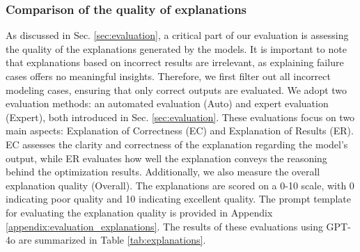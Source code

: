 \subsubsection{Comparison of the quality of explanations}
As discussed in Sec. \ref{sec:evaluation}, a critical part of our evaluation is assessing the quality of the explanations generated by the models. It is important to note that explanations based on incorrect results are irrelevant, as explaining failure cases offers no meaningful insights. Therefore, we first filter out all incorrect modeling cases, ensuring that only correct outputs are evaluated. We adopt two evaluation methods: an automated evaluation (Auto) and expert evaluation (Expert), both introduced in Sec. \ref{sec:evaluation}. These evaluations focus on two main aspects: Explanation of Correctness (EC) and Explanation of Results (ER). EC assesses the clarity and correctness of the explanation regarding the model's output, while ER evaluates how well the explanation conveys the reasoning behind the optimization results. Additionally, we also measure the overall explanation quality (Overall). The explanations are scored on a 0-10 scale, with 0 indicating poor quality and 10 indicating excellent quality. The prompt template for evaluating the explanation quality is provided in Appendix \ref{appendix:evaluation_explanations}. The results of these evaluations using GPT-4o are summarized in Table \ref{tab:explanations}.


